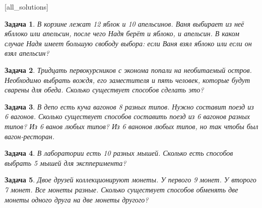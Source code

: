 \documentclass[12pt, a4paper]{article}
\newtheorem{problem}{Задача}
\begin{document}
[all_solutions]


\begin{problem}
В корзине лежат 12 яблок и 10 апельсинов. Ваня выбирает из неё ябллоко или апельсин, после чего Надя берёт и яблоко, и апельсин. В каком случае Надя имеет большую свободу выбора: если Ваня взял яблоко или если он взял апельсин? 
\begin{sol}

\end{sol}
\end{problem}



\begin{problem}
Тридцать первокурсников с эконома попали на необитаемый остров. Необходимо выбрать вождя, его заместителя и пять человек, которые будут сварены для обеда. Сколько существует способов сделать это?
\begin{sol}

\end{sol}
\end{problem}



\begin{problem}
В депо есть куча вагонов 8 разных типов. Нужно составит поезд из 6 вагонов. Сколько существует способов составить поезд из 6 вагонов разных типов? Из 6 ванов любых типов? Из 6 ванонов любых типов, но так чтобы был вагон-ресторан.
\begin{sol}

\end{sol}
\end{problem}



\begin{problem}
В лаборатории есть 10 разных мышей. Сколько есть способов выбрать 5 мышей для экспперимента? 
\begin{sol}

\end{sol}
\end{problem}



\begin{problem}
Двое друзей коллекционируют монеты. У первого 9 монет. У второго 7 монет. Все монеты разные. Сколько существует способов обменять две монеты одного друга на две монеты другого?
\begin{sol}

\end{sol}
\end{problem}
\end{document}
